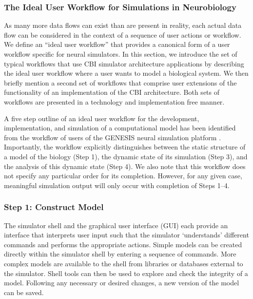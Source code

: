 \documentclass[12pt]{article}
\begin{document}
\subsubsection*{The Ideal User Workflow for Simulations in Neurobiology}

As many more data flows can exist than are present in reality, each actual
data flow can be considered in the context of a sequence of user
actions or workflow. We define an ``ideal user workflow'' that provides a canonical form
of a user workflow specific for neural simulators. In this section, we introduce
the set of typical workflows that use CBI simulator architecture
applications by describing the ideal user workflow where a user wants to model a biological system. We then briefly mention a second set of workflows that comprise user extensions of the
functionality of an implementation of the CBI architecture. Both sets of workflows are presented in a technology and implementation free manner.


A five step outline of an ideal user workflow for the development,
implementation, and simulation of a computational model has been
identified from the workflow of users of the GENESIS neural simulation
platform \cite{cornelis02:_tutor}.  Importantly, the workflow
explicitly distinguishes between the static structure of a model of
the biology (Step 1), the dynamic state of its simulation (Step 3),
and the analysis of this dynamic state (Step 4). We also note that
this workflow does not specify any particular order for its
completion. However, for any given case, meaningful simulation output
will only occur with completion of Steps 1--4.

\subsubsection*{Step 1: Construct Model}

The simulator shell and the graphical user interface (GUI) each
provide an interface that interprets user input such that the
simulator `understands' different commands and performs the
appropriate actions. Simple models can be created directly within the
simulator shell by entering a sequence of commands. More complex
models are available to the shell from libraries or databases external
to the simulator. Shell tools can then be used to explore and check
the integrity of a model. Following any necessary or desired changes,
a new version of the model can be saved.
\end{document}
